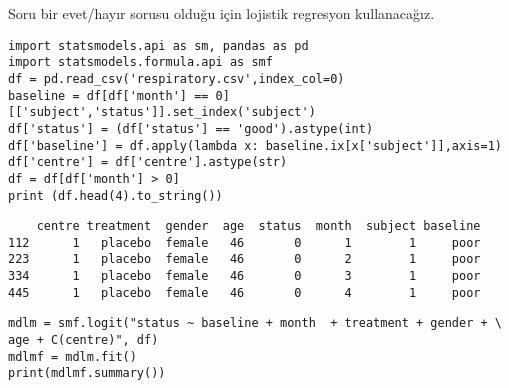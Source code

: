\documentclass[12pt,fleqn]{article}\usepackage{../../common}
\begin{document}
Soru bir evet/hayır sorusu olduğu için lojistik regresyon kullanacağız. 

\begin{verbatim}
import statsmodels.api as sm, pandas as pd
import statsmodels.formula.api as smf
df = pd.read_csv('respiratory.csv',index_col=0)
baseline = df[df['month'] == 0][['subject','status']].set_index('subject')
df['status'] = (df['status'] == 'good').astype(int)
df['baseline'] = df.apply(lambda x: baseline.ix[x['subject']],axis=1)
df['centre'] = df['centre'].astype(str)
df = df[df['month'] > 0]
print (df.head(4).to_string())
\end{verbatim}

\begin{verbatim}
    centre treatment  gender  age  status  month  subject baseline
112      1   placebo  female   46       0      1        1     poor
223      1   placebo  female   46       0      2        1     poor
334      1   placebo  female   46       0      3        1     poor
445      1   placebo  female   46       0      4        1     poor
\end{verbatim}

\begin{verbatim}
mdlm = smf.logit("status ~ baseline + month  + treatment + gender + \
age + C(centre)", df)
mdlmf = mdlm.fit()
print(mdlmf.summary())
\end{verbatim}
\end{document}
